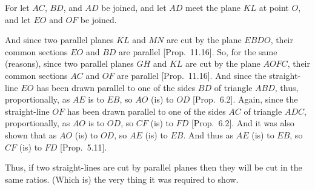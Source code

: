 \begin{Parallel}{}{}
{For let $AC$, $BD$, and $AD$ be joined, and let $AD$ meet the
plane $KL$ at point $O$, and let $EO$ and $OF$ be joined.

And since two parallel planes $KL$ and $MN$ are cut by the
plane $EBDO$, their common sections $EO$ and $BD$ are parallel
[Prop.~11.16]. So, for the same (reasons), 
since two parallel planes $GH$ and $KL$ are cut by the plane
$AOFC$, their common sections $AC$ and $OF$ are 
parallel [Prop.~11.16]. And since the straight-line $EO$ has been drawn parallel to
one of the sides $BD$ of triangle $ABD$, thus, proportionally, as 
$AE$ is to $EB$, so $AO$ (is) to $OD$ [Prop.~6.2]. 
Again, since the straight-line $OF$ has been drawn parallel to one of the sides $AC$
of triangle $ADC$, proportionally, as $AO$ is to $OD$, so $CF$ (is) to $FD$ [Prop.~6.2]. And it was also shown that as $AO$ (is) to $OD$, so $AE$ (is) to $EB$.
And thus as $AE$ (is) to $EB$, so $CF$ (is) to $FD$ [Prop.~5.11].\\

\epsfysize=3in
\centerline{}

Thus, if two straight-lines are cut by parallel planes then
they will be cut in the same ratios. (Which is) the very thing it was required to
show.}
\end{Parallel}

